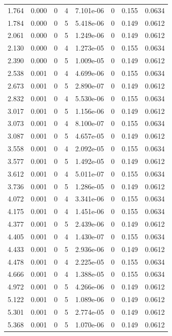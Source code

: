 \documentclass[preview]{standalone}
\begin{document}
{{\begin{tabular}{L{1.2cm}C{1.2cm} C{0.3cm}C{0.5cm} C{1.4cm}C{1.4cm} C{1.4cm}C{1.4cm}}
  1.764  &  0.000  & 0     &  4 &  7.101e-06  & 0  & 0.155 &  0.0634   \\ 
  1.784  &  0.000  & 0     &  5 &  5.418e-06  & 0  & 0.149 &  0.0612   \\ 
  2.061  &  0.000  & 0     &  5 &  1.249e-06  & 0  & 0.149 &  0.0612   \\ 
  2.130  &  0.000  & 0     &  4 &  1.273e-05  & 0  & 0.155 &  0.0634   \\ 
  2.390  &  0.000  & 0     &  5 &  1.009e-05  & 0  & 0.149 &  0.0612   \\ 
  2.538  &  0.001  & 0     &  4 &  4.699e-06  & 0  & 0.155 &  0.0634   \\ 
  2.673  &  0.001  & 0     &  5 &  2.890e-07  & 0  & 0.149 &  0.0612   \\ 
  2.832  &  0.001  & 0     &  4 &  5.530e-06  & 0  & 0.155 &  0.0634   \\ 
  3.017  &  0.001  & 0     &  5 &  1.156e-06  & 0  & 0.149 &  0.0612   \\ 
  3.073  &  0.001  & 0     &  4 &  8.100e-07  & 0  & 0.155 &  0.0634   \\ 
  3.087  &  0.001  & 0     &  5 &  4.657e-05  & 0  & 0.149 &  0.0612   \\ 
  3.558  &  0.001  & 0     &  4 &  2.092e-05  & 0  & 0.155 &  0.0634   \\ 
  3.577  &  0.001  & 0     &  5 &  1.492e-05  & 0  & 0.149 &  0.0612   \\ 
  3.612  &  0.001  & 0     &  4 &  5.011e-07  & 0  & 0.155 &  0.0634   \\ 
  3.736  &  0.001  & 0     &  5 &  1.286e-05  & 0  & 0.149 &  0.0612   \\ 
  4.072  &  0.001  & 0     &  4 &  3.341e-06  & 0  & 0.155 &  0.0634   \\ 
  4.175  &  0.001  & 0     &  4 &  1.451e-06  & 0  & 0.155 &  0.0634   \\ 
  4.377  &  0.001  & 0     &  5 &  2.439e-06  & 0  & 0.149 &  0.0612   \\ 
  4.405  &  0.001  & 0     &  4 &  1.430e-07  & 0  & 0.155 &  0.0634   \\ 
  4.433  &  0.001  & 0     &  5 &  2.936e-06  & 0  & 0.149 &  0.0612   \\ 
  4.478  &  0.001  & 0     &  4 &  2.225e-05  & 0  & 0.155 &  0.0634   \\ 
  4.666  &  0.001  & 0     &  4 &  1.388e-05  & 0  & 0.155 &  0.0634   \\ 
  4.972  &  0.001  & 0     &  5 &  4.266e-06  & 0  & 0.149 &  0.0612   \\ 
  5.122  &  0.001  & 0     &  5 &  1.089e-06  & 0  & 0.149 &  0.0612   \\ 
  5.301  &  0.001  & 0     &  5 &  2.774e-05  & 0  & 0.149 &  0.0612   \\ 
  5.368  &  0.001  & 0     &  5 &  1.070e-06  & 0  & 0.149 &  0.0612   \\ 
\hline 
\end{tabular} 

}}
\end{document}
